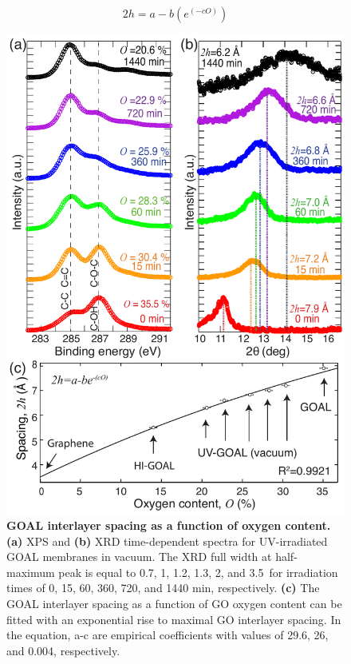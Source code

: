 \begin{equation}
2h = a-b(e^{(-cO)})
 \label{eqn5_pap4}
\end{equation}
\begin{figure}[t!]
  \centering
  \includegraphics[width=5in]{paper4/Fig3.pdf}
  \caption{\textbf{GOAL interlayer spacing as a function of oxygen content.} \textbf{(a)} XPS and \textbf{(b)} XRD time-dependent spectra for UV-irradiated GOAL membranes in vacuum. The XRD full width at half-maximum peak is equal to 0.7\textdegree, 1\textdegree, 1.2\textdegree, 1.3\textdegree, 2\textdegree, and 3.5\textdegree \  for irradiation times of 0, 15, 60, 360, 720, and 1440 min, respectively. \textbf{(c)} The GOAL interlayer spacing as a function of GO oxygen content can be fitted with an exponential rise to maximal GO interlayer spacing. In the equation, a-c are empirical coefficients with values of 29.6, 26, and 0.004, respectively.}
  \label{Fig3_pap4}
\end{figure}
